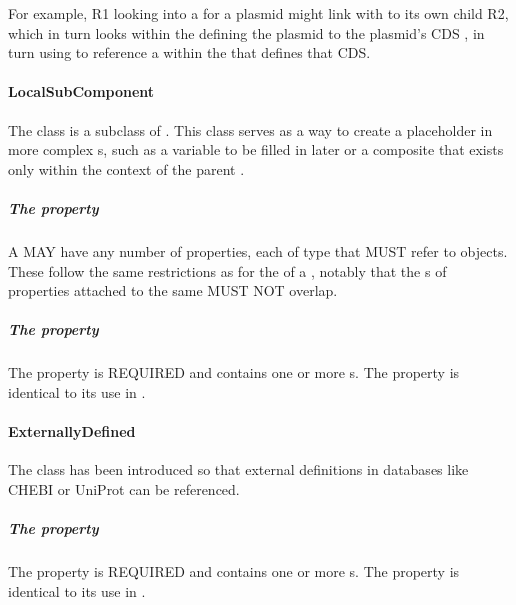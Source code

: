 For example,  R1 looking into a  for a plasmid might link with  to its own child  R2, which in turn looks within the  defining the plasmid to the plasmid's CDS , in turn using  to reference a  within the  that defines that CDS.



\paragraph{LocalSubComponent}
\label{sec:LocalSubComponent}

The  class is a subclass of . 
This class serves as a way to create a placeholder in more complex s, such as a variable to be filled in later or a composite that exists only within the context of the parent .

\subparagraph{The  property}\label{sec:hasLocation:LSR}

A  MAY have any number of  properties, each of type  that MUST refer to  objects. 
These follow the same restrictions as for the  of a , notably that the s of  properties attached to the same  MUST NOT overlap.


\subparagraph{The  property}\label{sec:type:LSC}

The  property is REQUIRED and contains one or more s. The  property is identical to its use in .

\paragraph{ExternallyDefined}
\label{sec:ExternallyDefined}

The  class has been introduced so that external definitions in databases like CHEBI or UniProt can be referenced.

\subparagraph{The  property}\label{sec:type:ED}

The  property is REQUIRED and contains one or more s. The  property is identical to its use in .

